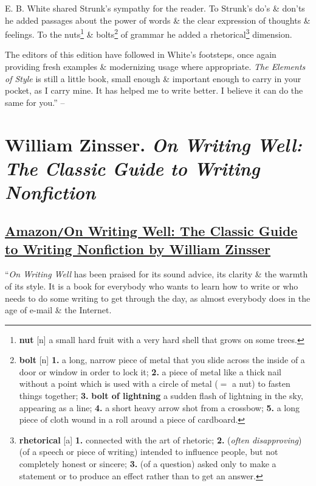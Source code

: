 \documentclass[oneside]{book}
\numberwithin{equation}{section}
\begin{document}
E. B. White shared Strunk's sympathy for the reader. To Strunk's do's \& don'ts he added passages about the power of words \& the clear expression of thoughts \& feelings. To the nuts\footnote{\textbf{nut} [n] a small hard fruit with a very hard shell that grows on some trees.} \& bolts\footnote{\textbf{bolt} [n] \textbf{1.} a long, narrow piece of metal that you slide across the inside of a door or window in order to lock it; \textbf{2.} a piece of metal like a thick nail without a point which is used with a circle of metal ($=$ a nut) to fasten things together; \textbf{3.} \textbf{bolt of lightning} a sudden flash of lightning in the sky, appearing as a line; \textbf{4.} a short heavy arrow shot from a crossbow; \textbf{5.} a long piece of cloth wound in a roll around a piece of cardboard.} of grammar he added a rhetorical\footnote{\textbf{rhetorical} [a] \textbf{1.} connected with the art of rhetoric; \textbf{2.} (\textit{often disapproving}) (of a speech or piece of writing) intended to influence people, but not completely honest or sincere; \textbf{3.} (of a question) asked only to make a statement or to produce an effect rather than to get an answer.} dimension.

The editors of this edition have followed in White's footsteps, once again providing fresh examples \& modernizing usage where appropriate. \textit{The Elements of Style} is still a little book, small enough \& important enough to carry in your pocket, as I carry mine. It has helped me to write better. I believe it can do the same for you.'' -- \cite[Afterword by Charles Osgood, p. 104]{Strunk_White2019}


\chapter{William Zinsser. \textit{On Writing Well: The Classic Guide to Writing Nonfiction}}

\section*{\href{https://www.amazon.com/Writing-Well-Classic-Guide-Nonfiction/dp/0060891548}{Amazon\texttt{/}On Writing Well: The Classic Guide to Writing Nonfiction by William Zinsser}}
``\textit{On Writing Well} has been praised for its sound advice, its clarity \& the warmth of its style. It is a book for everybody who wants to learn how to write or who needs to do some writing to get through the day, as almost everybody does in the age of e-mail \& the Internet.
\end{document}
